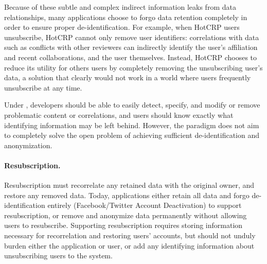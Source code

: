 Because of these subtle and complex indirect information leaks from data relationships, many
applications choose to forgo data retention completely in order to ensure proper de-identification.
For example, when HotCRP users unsubscribe, 
HotCRP cannot only remove user identifiers: correlations with data such as conflicts with other
reviewers can indirectly identify the user's affiliation and recent collaborations, and the user
themselves. Instead, HotCRP chooses to reduce its utility for others users by completely removing
the unsubscribing user's data, a solution that clearly would not work in a world where users
frequently unsubscribe at any time.

Under \sys, developers should be able to easily detect, specify, and modify or remove problematic
content or correlations, and users should know exactly what identifying information may be left
behind. However, the \sys paradigm does not aim to completely solve the open problem of achieving sufficient
de-identification and anonymization.

\paragraph{Resubscription.}
Resubscription must recorrelate any retained data with the original owner, and restore any removed
data. Today, applications either retain all data and forgo de-identification entirely
(Facebook/Twitter Account Deactivation) to support resubscription, or remove and anonymize data
permanently without allowing users to resubscribe. Supporting resubscription requires storing
information necessary for recorrelation and restoring users' accounts, but should not unduly burden
either the application or user, or add any identifying information about unsubscribing users to the
system.

%


